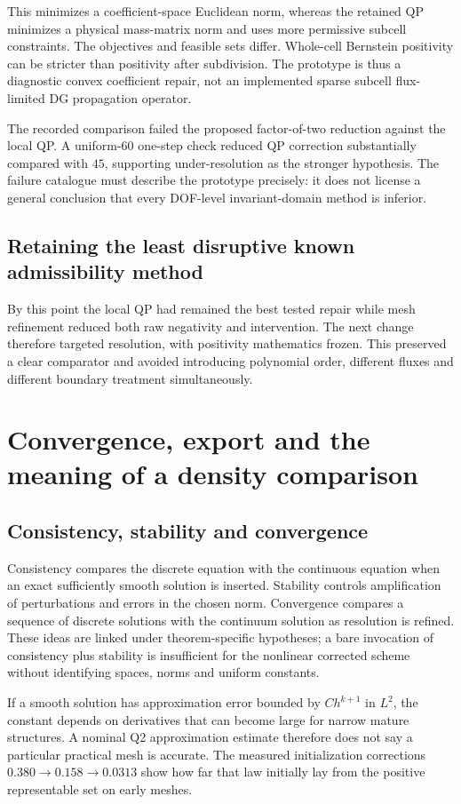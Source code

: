 This minimizes a coefficient-space Euclidean norm, whereas the retained QP minimizes a physical mass-matrix norm and uses more permissive subcell constraints. The objectives and feasible sets differ. Whole-cell Bernstein positivity can be stricter than positivity after subdivision. The prototype is thus a diagnostic convex coefficient repair, not an implemented sparse subcell flux-limited DG propagation operator.

The recorded comparison failed the proposed factor-of-two reduction against the local QP. A uniform-$60$ one-step check reduced QP correction substantially compared with $45$, supporting under-resolution as the stronger hypothesis. The failure catalogue must describe the prototype precisely: it does not license a general conclusion that every DOF-level invariant-domain method is inferior.

\section{Retaining the least disruptive known admissibility method}
By this point the local QP had remained the best tested repair while mesh refinement reduced both raw negativity and intervention. The next change therefore targeted resolution, with positivity mathematics frozen. This preserved a clear comparator and avoided introducing polynomial order, different fluxes and different boundary treatment simultaneously.

\chapter{Convergence, export and the meaning of a density comparison}\label{ch:convergence}
\section{Consistency, stability and convergence}
Consistency compares the discrete equation with the continuous equation when an exact sufficiently smooth solution is inserted. Stability controls amplification of perturbations and errors in the chosen norm. Convergence compares a sequence of discrete solutions with the continuum solution as resolution is refined. These ideas are linked under theorem-specific hypotheses; a bare invocation of consistency plus stability is insufficient for the nonlinear corrected scheme without identifying spaces, norms and uniform constants.

If a smooth solution has approximation error bounded by $Ch^{k+1}$ in $L^2$, the constant depends on derivatives that can become large for narrow mature structures. A nominal Q2 approximation estimate therefore does not say a particular practical mesh is accurate. The measured initialization corrections $0.380\to0.158\to0.0313$ show how far that law initially lay from the positive representable set on early meshes.

